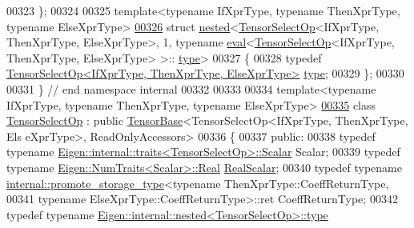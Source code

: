 \begin{DoxyCode}
00323 \};
00324 
00325 \textcolor{keyword}{template}<\textcolor{keyword}{typename} IfXprType, \textcolor{keyword}{typename} ThenXprType, \textcolor{keyword}{typename} ElseXprType>
\hyperlink{struct_eigen_1_1internal_1_1nested_3_01_tensor_select_op_3_01_if_xpr_type_00_01_then_xpr_type_0010d0192d54c3f780dbab86be6337fa47}{00326} \textcolor{keyword}{struct }\hyperlink{struct_eigen_1_1internal_1_1nested}{nested}<\hyperlink{class_eigen_1_1_tensor_select_op}{TensorSelectOp}<IfXprType, ThenXprType, ElseXprType>, 1, typename 
      \hyperlink{struct_eigen_1_1internal_1_1eval}{eval}<\hyperlink{class_eigen_1_1_tensor_select_op}{TensorSelectOp}<IfXprType, ThenXprType, ElseXprType> >::
      \hyperlink{class_eigen_1_1_tensor_select_op}{type}>
00327 \{
00328   \textcolor{keyword}{typedef} \hyperlink{class_eigen_1_1_tensor_select_op}{TensorSelectOp<IfXprType, ThenXprType, ElseXprType>}
       \hyperlink{class_eigen_1_1_tensor_select_op}{type};
00329 \};
00330 
00331 \}  \textcolor{comment}{// end namespace internal}
00332 
00333 
00334 \textcolor{keyword}{template}<\textcolor{keyword}{typename} IfXprType, \textcolor{keyword}{typename} ThenXprType, \textcolor{keyword}{typename} ElseXprType>
\hyperlink{class_eigen_1_1_tensor_select_op}{00335} \textcolor{keyword}{class }\hyperlink{class_eigen_1_1_tensor_select_op}{TensorSelectOp} : \textcolor{keyword}{public} \hyperlink{class_eigen_1_1_tensor_base}{TensorBase}<TensorSelectOp<IfXprType, ThenXprType, Els
      eXprType>, ReadOnlyAccessors>
00336 \{
00337   \textcolor{keyword}{public}:
00338     \textcolor{keyword}{typedef} \textcolor{keyword}{typename} \hyperlink{struct_eigen_1_1internal_1_1traits}{Eigen::internal::traits<TensorSelectOp>::Scalar}
       Scalar;
00339     \textcolor{keyword}{typedef} \textcolor{keyword}{typename} \hyperlink{group___sparse_core___module}{Eigen::NumTraits<Scalar>::Real} 
      \hyperlink{group___sparse_core___module}{RealScalar};
00340     \textcolor{keyword}{typedef} \textcolor{keyword}{typename} \hyperlink{struct_eigen_1_1internal_1_1promote__storage__type}{internal::promote\_storage\_type}<\textcolor{keyword}{typename} 
      ThenXprType::CoeffReturnType,
00341                                                     \textcolor{keyword}{typename} ElseXprType::CoeffReturnType>::ret 
      CoeffReturnType;
00342     \textcolor{keyword}{typedef} \textcolor{keyword}{typename} \hyperlink{class_eigen_1_1internal_1_1_tensor_lazy_evaluator_writable}{Eigen::internal::nested<TensorSelectOp>::type}

\end{DoxyCode}
